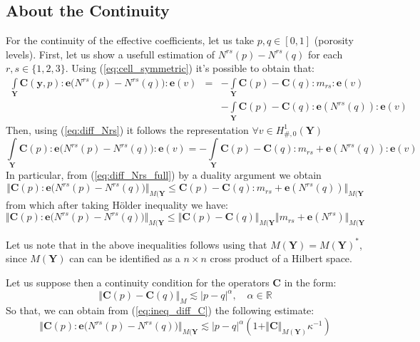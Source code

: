 \subsection{About the Continuity}
For the continuity of the effective coefficients, let us take $p,q \in [0,1]$ (porosity levels). First, let us show a usefull estimation of $N^{rs}(p)-N^{rs}(q)$ for each $r,s \in \{1,2,3\}$. Using (\ref{eq:cell_symmetric}) it's possible to obtain that:
\begin{equation}
    \label{eq:diff_Nrs}
    \begin{array}{ccc}
        \int\limits_{\mathbf{Y}} \mathbf{C}(\mathbf{y},p):\mathbf{e}\big( N^{rs}(p)-N^{rs}(q) \big) :\mathbf{e}(v) & = & -\int\limits_{\mathbf{Y}} \mathbf{C}(p)-\mathbf{C}(q) : m_{rs}:\mathbf{e}(v) \\
        &\,&- \int\limits_{\mathbf{Y}}\mathbf{C}(p)-\mathbf{C}(q):\mathbf{e}(N^{rs}(q)):\mathbf{e}(v)
    \end{array}
\end{equation}
Then, using (\ref{eq:diff_Nrs}) it follows the representation $\forall v \in H^1_{\#,0}(\mathbf{Y})$
\begin{equation}
    \label{eq:diff_Nrs_full}
    \int\limits_{\mathbf{Y}} \mathbf{C}(p):\mathbf{e}\big(N^{rs}(p)-N^{rs}(q)\big):\mathbf{e}(v) = -\int\limits_{\mathbf{Y}} \mathbf{C}(p)-\mathbf{C}(q):m_{rs}+\mathbf{e}(N^{rs}(q)):\mathbf{e}(v)
\end{equation}
In particular, from (\ref{eq:diff_Nrs_full}) by a duality argument we obtain
\begin{equation*}
    \Vert \mathbf{C}(p):\mathbf{e}\big(N^{rs}(p)-N^{rs}(q)\big) \Vert_{M(\mathbf{Y}} \leq \mathbf{C}(p)-\mathbf{C}(q):m_{rs}+\mathbf{e}(N^{rs}(q))\Vert_{M(\mathbf{Y}}
\end{equation*}
from which after taking H\"{o}lder inequality we have:
\begin{equation}
    \label{eq:ineq_diff_C}
    \Vert \mathbf{C}(p):\mathbf{e}\big(N^{rs}(p)-N^{rs}(q)\big) \Vert_{M(\mathbf{Y}} \leq \Vert \mathbf{C}(p)-\mathbf{C}(q) \Vert_{M(\mathbf{Y}} \Vert m_{rs}+\mathbf{e}(N^{rs}) \Vert_{M(\mathbf{Y}}
\end{equation}
\begin{rem}
Let us note that in the above inequalities follows using that $M(\mathbf{Y}) = M(\mathbf{Y})^*$, since $M(\mathbf{Y})$ can can be identified as a $n\times n$ cross product of a Hilbert space.
\end{rem}
Let us suppose then a continuity condition for the operators $\mathbf{C}$ in the form:
\begin{equation*}
    \Vert \mathbf{C}(p)-\mathbf{C}(q) \Vert_{M} \lesssim \vert p-q\vert^{\alpha}, \quad \alpha \in \mathbb{R}
\end{equation*}
So that, we can obtain from (\ref{eq:ineq_diff_C}) the following estimate:
\begin{equation*}
    \Vert \mathbf{C}(p):\mathbf{e}\big(N^{rs}(p)-N^{rs}(q) \big) \Vert_{M(\mathbf{Y}} \lesssim \vert p-q\vert^{\alpha} (1+ \Vert \mathbf{C}\Vert_{M(\mathbf{Y})} \kappa^{-1})
\end{equation*}

